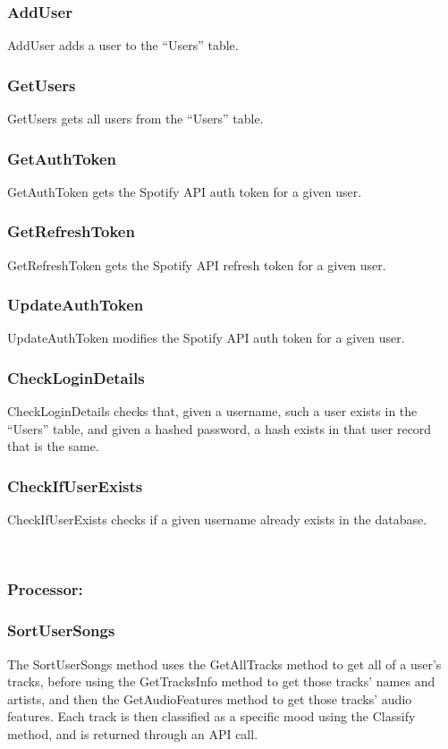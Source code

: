 \documentclass[11pt]{report}
\begin{document}
\subsubsection{AddUser}
AddUser adds a user to the “Users” table.

\subsubsection{GetUsers}
GetUsers gets all users from the “Users” table.

\subsubsection{GetAuthToken}
GetAuthToken gets the Spotify API auth token for a given user.

\subsubsection{GetRefreshToken}
GetRefreshToken gets the Spotify API refresh token for a given user.

\subsubsection{UpdateAuthToken}
UpdateAuthToken modifies the Spotify API auth token for a given user.

\subsubsection{CheckLoginDetails}
CheckLoginDetails checks that, given a username, such a user exists in the “Users” table, and given a hashed password, a hash exists in that user record that is the same.

\subsubsection{CheckIfUserExists}
CheckIfUserExists checks if a given username already exists in the database.



\leavevmode \\

\subsubsection{Processor:}

\hrulefill

\subsubsection{SortUserSongs}
The SortUserSongs method uses the GetAllTracks method to get all of a user’s tracks, before using the GetTracksInfo method to get those tracks’ names and artists, and then the GetAudioFeatures method to get those tracks’ audio features. Each track is then classified as a specific mood using the Classify method, and is returned through an API call.
\end{document}
